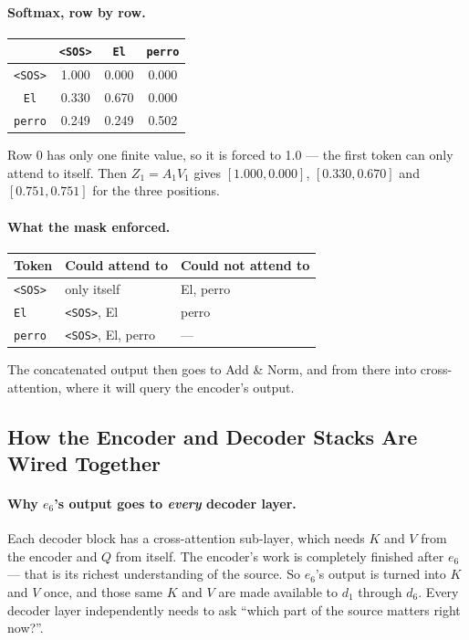 \documentclass[11pt,a4paper]{article}
\begin{document}
\paragraph{Softmax, row by row.}
\begin{center}
\begin{tabular}{c|ccc}
 & \texttt{<SOS>} & \texttt{El} & \texttt{perro} \\
\hline
\texttt{<SOS>} & 1.000 & 0.000 & 0.000 \\
\texttt{El} & 0.330 & 0.670 & 0.000 \\
\texttt{perro} & 0.249 & 0.249 & 0.502 \\
\end{tabular}
\end{center}
Row 0 has only one finite value, so it is forced to 1.0 --- the first token can only attend to
itself. Then $Z_1 = A_1 V_1$ gives $[1.000, 0.000]$, $[0.330, 0.670]$ and $[0.751, 0.751]$
for the three positions.

\paragraph{What the mask enforced.}
\begin{center}
\begin{tabularx}{\textwidth}{lYY}
\textbf{Token} & \textbf{Could attend to} & \textbf{Could not attend to} \\
\hline
\texttt{<SOS>} & only itself & El, perro \\
\texttt{El} & \texttt{<SOS>}, El & perro \\
\texttt{perro} & \texttt{<SOS>}, El, perro & --- \\
\end{tabularx}
\end{center}
The concatenated output then goes to Add \& Norm, and from there into cross-attention, where
it will query the encoder's output.

\subsection{How the Encoder and Decoder Stacks Are Wired Together}

\paragraph{Why $e_6$'s output goes to \emph{every} decoder layer.} Each decoder block has a
cross-attention sub-layer, which needs $K$ and $V$ from the encoder and $Q$ from itself. The
encoder's work is completely finished after $e_6$ --- that is its richest understanding of the
source. So $e_6$'s output is turned into $K$ and $V$ once, and those same $K$ and $V$ are made
available to $d_1$ through $d_6$. Every decoder layer independently needs to ask ``which part
of the source matters right now?''.
\end{document}
